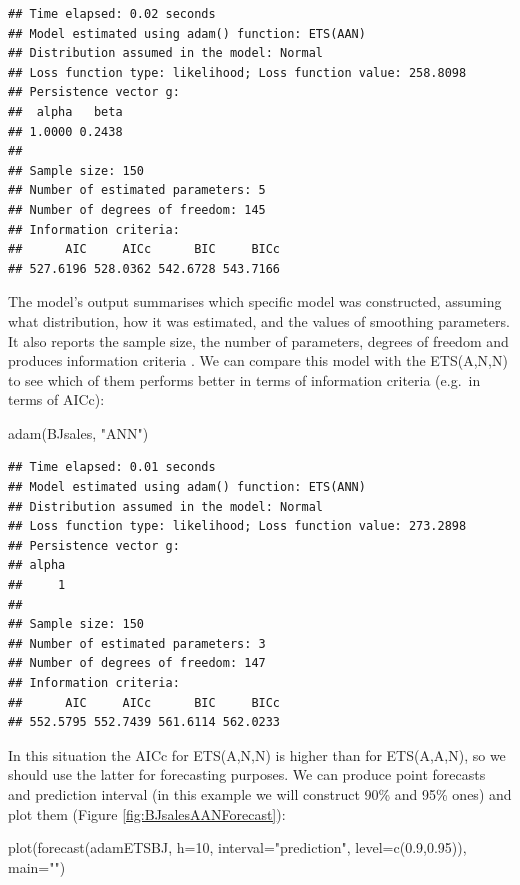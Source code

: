 \documentclass[
]{book}
\newenvironment{Shaded}{\begin{snugshade}}{\end{snugshade}}
\newcommand{\AttributeTok}[1]{\textcolor[rgb]{0.77,0.63,0.00}{#1}}
\newcommand{\DecValTok}[1]{\textcolor[rgb]{0.00,0.00,0.81}{#1}}
\newcommand{\FloatTok}[1]{\textcolor[rgb]{0.00,0.00,0.81}{#1}}
\newcommand{\FunctionTok}[1]{\textcolor[rgb]{0.00,0.00,0.00}{#1}}
\newcommand{\NormalTok}[1]{#1}
\newcommand{\StringTok}[1]{\textcolor[rgb]{0.31,0.60,0.02}{#1}}
\theoremstyle{definition}
\theoremstyle{definition}
\theoremstyle{definition}
\theoremstyle{definition}
\theoremstyle{remark}
\begin{document}
\begin{verbatim}
## Time elapsed: 0.02 seconds
## Model estimated using adam() function: ETS(AAN)
## Distribution assumed in the model: Normal
## Loss function type: likelihood; Loss function value: 258.8098
## Persistence vector g:
##  alpha   beta 
## 1.0000 0.2438 
## 
## Sample size: 150
## Number of estimated parameters: 5
## Number of degrees of freedom: 145
## Information criteria:
##      AIC     AICc      BIC     BICc 
## 527.6196 528.0362 542.6728 543.7166
\end{verbatim}

The model's output summarises which specific model was constructed, assuming what distribution, how it was estimated, and the values of smoothing parameters. It also reports the sample size, the number of parameters, degrees of freedom and produces information criteria \citep[see Section 13.4 of][]{SvetunkovSBA}. We can compare this model with the ETS(A,N,N) to see which of them performs better in terms of information criteria (e.g.~in terms of AICc):

\begin{Shaded}
\begin{Highlighting}[]
\FunctionTok{adam}\NormalTok{(BJsales, }\StringTok{"ANN"}\NormalTok{)}
\end{Highlighting}
\end{Shaded}

\begin{verbatim}
## Time elapsed: 0.01 seconds
## Model estimated using adam() function: ETS(ANN)
## Distribution assumed in the model: Normal
## Loss function type: likelihood; Loss function value: 273.2898
## Persistence vector g:
## alpha 
##     1 
## 
## Sample size: 150
## Number of estimated parameters: 3
## Number of degrees of freedom: 147
## Information criteria:
##      AIC     AICc      BIC     BICc 
## 552.5795 552.7439 561.6114 562.0233
\end{verbatim}

In this situation the AICc for ETS(A,N,N) is higher than for ETS(A,A,N), so we should use the latter for forecasting purposes. We can produce point forecasts and prediction interval (in this example we will construct 90\% and 95\% ones) and plot them (Figure \ref{fig:BJsalesAANForecast}):

\begin{Shaded}
\begin{Highlighting}[]
\FunctionTok{plot}\NormalTok{(}\FunctionTok{forecast}\NormalTok{(adamETSBJ, }\AttributeTok{h=}\DecValTok{10}\NormalTok{,}
              \AttributeTok{interval=}\StringTok{"prediction"}\NormalTok{, }\AttributeTok{level=}\FunctionTok{c}\NormalTok{(}\FloatTok{0.9}\NormalTok{,}\FloatTok{0.95}\NormalTok{)),}
     \AttributeTok{main=}\StringTok{""}\NormalTok{)}
\end{Highlighting}
\end{Shaded}
\end{document}

